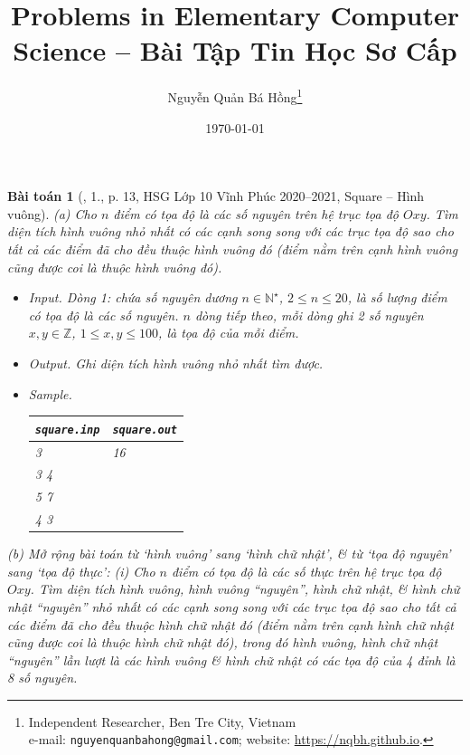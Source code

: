 \documentclass{article}
\title{Problems in Elementary Computer Science -- Bài Tập Tin Học Sơ Cấp}
\author{Nguyễn Quản Bá Hồng\footnote{Independent Researcher, Ben Tre City, Vietnam\\e-mail: \texttt{nguyenquanbahong@gmail.com}; website: \url{https://nqbh.github.io}.}}
\date{\today}
\newtheorem{baitoan}{Bài toán}
\begin{document}
\maketitle


\begin{baitoan}[\cite{Trung_HSG_THPT_Tin}, 1., p. 13, HSG Lớp 10 Vĩnh Phúc 2020--2021, Square -- Hình vuông]
	(a) Cho $n$ điểm có tọa độ là các số nguyên trên hệ trục tọa độ $Oxy$. Tìm diện tích hình vuông nhỏ nhất có các cạnh song song với các trục tọa độ sao cho tất cả các điểm đã cho đều thuộc hình vuông đó (điểm nằm trên cạnh hình vuông cũng được coi là thuộc hình vuông đó).
	\begin{itemize}
		\item {\sf Input.} Dòng 1: chứa số nguyên dương $n\in\mathbb{N}^\star$, $2\le n\le20$, là số lượng điểm có tọa độ là các số nguyên. $n$ dòng tiếp theo, mỗi dòng ghi 2 số nguyên $x,y\in\mathbb{Z}$, $1\le x,y\le100$, là tọa độ của mỗi điểm.
		\item {\sf Output.} Ghi diện tích hình vuông nhỏ nhất tìm được.
		\item {\sf Sample.}
		\begin{table}[H]
			\centering
			\begin{tabular}{|l|l|}
				\hline
				{\tt square.inp} & {\tt square.out} \\
				\hline
				3 & 16 \\
				3 4 &  \\
				5 7 &  \\
				4 3 &  \\
				\hline
			\end{tabular}
		\end{table}
	\end{itemize}
	(b) Mở rộng bài toán từ `hình vuông' sang `hình chữ nhật', \& từ `tọa độ nguyên' sang `tọa độ thực': (i) Cho $n$ điểm có tọa độ là các số thực trên hệ trục tọa độ $Oxy$. Tìm diện tích hình vuông, hình vuông ``nguyên'', hình chữ nhật, \& hình chữ nhật ``nguyên'' nhỏ nhất có các cạnh song song với các trục tọa độ sao cho tất cả các điểm đã cho đều thuộc hình chữ nhật đó (điểm nằm trên cạnh hình chữ nhật cũng được coi là thuộc hình chữ nhật đó), trong đó {\rm hình vuông, hình chữ nhật ``nguyên''} lần lượt là các hình vuông \& hình chữ nhật có các tọa độ của 4 đỉnh là 8 số nguyên.
\end{baitoan}
\end{document}
